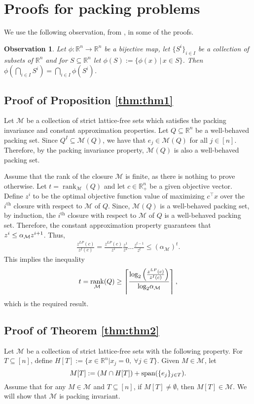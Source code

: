 \documentclass[11pt]{article}
\newcommand{\R}{\mathbb{R}}
\newcommand{\seq}{\subseteq}
\DeclareMathOperator{\rank}{rank}
\newcommand{\Mset}{M}
\newcommand{\M}{\mathcal{\Mset}}
\newcommand{\Tset}{T}
\newtheorem{observation}{Observation}
\newcommand{\cred}{\color{black}}
\newcommand{\zLPc}{z^{LP}(c)}
\newcommand{\zIc}{z^{I}(c)}
\def\spann{\mathop{\rm span}}
\begin{document}
\section{Proofs for packing problems}
\label{sec:Packing}
We use the following observation, from \cite{bodur2016aggregation}, in some of the proofs.
\begin{observation} \label{obs:bijection}
Let $\phi:\mathbb{R}^n \rightarrow \mathbb{R}^n$ be a bijective map, let $\{S^i\}_{i \in I}$ be a collection of subsets of $\mathbb{R}^n$ and {\cred for $S \seq \mathbb{R}^n$} let $\phi(S):= \{ \phi(x) \,|\, x \in S\}$. Then $\phi\left(\bigcap_{i \in I} S^i\right) = \bigcap_{i \in I} \phi(S^i)$.
\end{observation}
\subsection{Proof of Proposition \ref{thm:thm1}}
\label{subsec:4.1}
Let $\M$ be a collection of strict lattice-free sets which satisfies the packing invariance and
constant approximation properties. Let $Q \seq \R^n$ be a well-behaved packing set. Since $Q^I \seq \M(Q)$, we have that $e_j \in \M(Q)$ for all $j \in [n]$. Therefore, by the packing invariance property, $\M(Q)$ is also a well-behaved packing set.

{\cred Assume that the rank of the closure $\M$ is finite, as there is nothing to prove otherwise.} Let $t = \rank_{\M}(Q)$ and let $c \in \R_+^n$ be a given objective vector. Define $z^{i}$ to be the optimal objective function value of maximizing $c^\top x$ over the $i^{\text{th}}$ closure with respect to $\M$ of $Q$. Since, $\M(Q)$ is a well-behaved packing set, by induction, the $i^{\text{th}}$ closure with respect to $\M$ of $Q$ is a well-behaved packing set. Therefore, the constant approximation property guarantees that $z^i \le {\cred \alpha_\M} z^{i+1}$. Thus,
\begin{eqnarray*}
\frac{\zLPc}{\zIc} = \frac{\zLPc}{z^1} \frac{z^1}{z^2}\dots\frac{z^{t-1}}{z^{t}} \leq {(\alpha_\M)}^{t}.
\end{eqnarray*}
This implies the inequality
\begin{eqnarray*}
t = \rank_{\M}(Q) \geq \left\lceil \frac{\textup{log}_2\left( \frac{\zLPc}{\zIc}\right)}{\textup{log}_2 \alpha_\M} \right\rceil,
\end{eqnarray*}
which is the required result.
\subsection{Proof of Theorem \ref{thm:thm2}}
\label{subsec:4.2}
Let $\M$ be a collection of strict lattice-free sets with the following property. For $\Tset \seq [n]$, define $H[\Tset] := \{ x \in \R^n | x_j = 0, \ \forall j \in T\}$. Given $\Mset \in \M$, let 
$$M[\Tset] := ( M \cap H[\Tset] ) + \spann ( \{ e_{j} \}_{j \in T} ). $$ 
Assume that for any $\Mset \in \M$ and $T \seq [n]$, if $M[\Tset] \neq \emptyset$, then $M[\Tset] \in \M$. We will show that $\M$ is packing invariant. 
\end{document}
